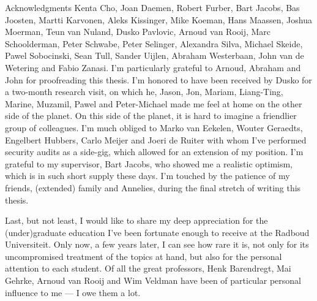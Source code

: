\begin{parsec}
\begin{point}{Acknowledgments}
    Kenta Cho,
    Joan Daemen,
    Robert Furber,
    Bart Jacobs,
    Bas Joosten,
    Martti Karvonen,
    Aleks Kissinger,
    Mike Koeman,
    Hans Maassen,
    Joshua Moerman,
    Teun van Nuland,
    Dusko Pavlovic,
    Arnoud van Rooij,
    Marc Schoolderman,
    Peter Schwabe,
    Peter Selinger,
    Alexandra Silva,
    Michael Skeide,
    Pawel Sobocinski,
    Sean Tull,
    Sander Uijlen,
    Abraham Westerbaan,
    John van de Wetering and
    Fabio Zanasi.
I'm particularly grateful to Arnoud, Abraham and John
    for proofreading this thesis.
I'm honored to have been received by Dusko
    for a two-month research visit,
    on which he, Jason, Jon, Mariam, Liang-Ting, Marine, Muzamil, Pawel
    and Peter-Michael made me feel at home on the other side of the planet.
On this side of the planet,
    it is hard to imagine a friendlier group of colleagues.
I'm much obliged to Marko van Eekelen,
    Wouter Geraedts,
    Engelbert Hubbers,
    Carlo Meijer and
    Joeri de Ruiter
    with whom I've performed security audits as a side-gig,
    which allowed for an extension of my position.
I'm grateful to my supervisor, Bart Jacobs,
    who showed me a realistic optimism,
    which is in such short supply these days.
I'm touched by the patience of my friends, (extended) family and Annelies,
    during the final stretch of writing this thesis.

Last, but not least, I would like to share my deep appreciation
    for the (under)graduate education
    I've been fortunate enough to receive at the Radboud Universiteit.
Only now, a few years later,
    I can see how rare it is,
    not only for its uncompromised treatment of the topics at hand,
    but also for the personal attention to each student.
Of all the great professors,
Henk Barendregt,
    Mai Gehrke, Arnoud van Rooij and Wim Veldman
    have been of particular personal influence to me --- I owe them a lot.
\end{point}
\end{parsec}


